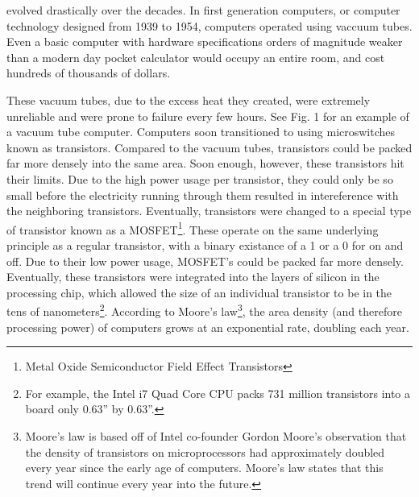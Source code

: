 \documentclass[10pt,journal,compsoc]{IEEEtran}
\begin{document}
 

 evolved drastically over the decades. In first generation computers, or computer technology designed from 1939 to 1954, computers operated using vaccuum tubes. Even a basic computer with hardware specifications orders of magnitude weaker than a modern day pocket calculator would occupy an entire room, and cost hundreds of thousands of dollars\cite{URI}.



These vacuum tubes, due to the excess heat they created, were extremely unreliable and were prone to failure every few hours. See Fig. 1 for an example of a vacuum tube computer. Computers soon transitioned to using microswitches known as transistors.  Compared to the vacuum tubes, transistors could be packed far more densely into the same area.  Soon enough, however, these transistors hit their limits. Due to the high power usage per transistor, they could only be so small before the electricity running through them resulted in intereference with the neighboring transistors. Eventually, transistors were changed to a special type of transistor known as a MOSFET\footnote{Metal Oxide Semiconductor Field Effect Transistors}. These operate on the same underlying principle as a regular transistor, with a binary existance of a 1 or a 0 for on and off. Due to their low power usage, MOSFET's could be packed far more densely. Eventually, these transistors were integrated into the layers of silicon in the processing chip, which allowed the size of an individual transistor to be in the tens of nanometers\cite{Tom's}\footnote{For example, the Intel i7 Quad Core CPU packs 731 million transistors into a board only 0.63'' by 0.63''\cite{Tom's}.}. According to Moore's law\footnote{Moore's law is based off of Intel co-founder Gordon Moore's observation that the density of transistors on microprocessors had approximately doubled every year since the early age of computers. Moore's law states that this trend will continue every year into the future.}, the area density (and therefore processing power) of computers grows at an exponential rate, doubling each year\cite{Moore}.
\end{document}
